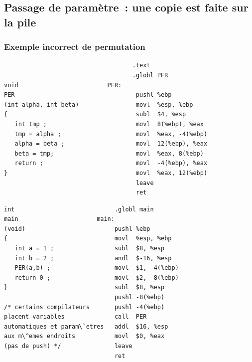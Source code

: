\begin{frame}[fragile]
  \section{Passage de param\`etre~: une copie est faite sur la pile}%
  \frametitle{Exemple incorrect de permutation}
\begin{verbatim}
                                    .text                    
                                    .globl PER           
void                         PER:                    
PER                                  pushl %ebp          
(int alpha, int beta)                movl  %esp, %ebp        
{                                    subl  $4, %esp       
   int tmp ;                         movl  8(%ebp), %eax     
   tmp = alpha ;                     movl  %eax, -4(%ebp)
   alpha = beta ;                    movl  12(%ebp), %eax
   beta = tmp;                       movl  %eax, 8(%ebp) 
   return ;                          movl  -4(%ebp), %eax 
}                                    movl  %eax, 12(%ebp)
                                     leave               
                                     ret                 
\end{verbatim}
\end{frame}
\begin{frame}[fragile]
\begin{verbatim}
int                            .globl main   
main                      main:         
(void)                         pushl %ebp     
{                              movl  %esp, %ebp    
   int a = 1 ;                 subl  $8, %esp  
   int b = 2 ;                 andl  $-16, %esp    
   PER(a,b) ;                  movl  $1, -4(%ebp)  
   return 0 ;                  movl  $2, -8(%ebp)  
}                              subl  $8, %esp  
                               pushl -8(%ebp)  
/* certains compilateurs       pushl -4(%ebp)  
placent variables              call  PER       
automatiques et param\`etres   addl  $16, %esp 
aux m\^emes endroits           movl  $0, %eax  
(pas de push) */               leave           
                               ret            
\end{verbatim}
\end{frame}
